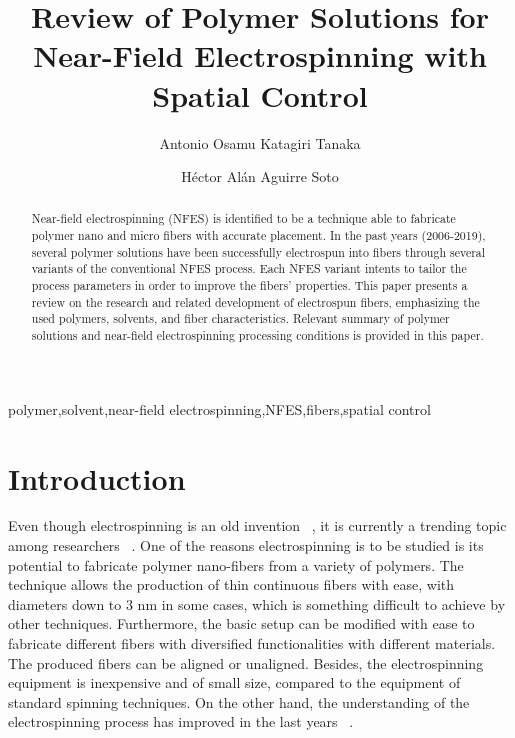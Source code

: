 \documentclass[3p,,preprint,12pt]{elsarticle}
\begin{document}
\begin{frontmatter}
	
\title{Review of Polymer Solutions for Near-Field Electrospinning with Spatial Control
}
    
\author[]{Antonio Osamu Katagiri Tanaka}
\author[]{H{\'e}ctor Al\'{a}n Aguirre Soto}
    

\begin{abstract}
Near-field electrospinning (NFES) is identified to be a technique able to fabricate polymer nano and micro fibers with accurate placement. In the past years (2006-2019), several polymer solutions have been successfully electrospun into fibers through several variants of the conventional NFES process. Each NFES variant intents to tailor the process parameters in order to improve the fibers' properties. This paper presents a review on the research and related development of electrospun fibers, emphasizing the used polymers, solvents, and fiber characteristics. Relevant summary of polymer solutions and near-field electrospinning processing conditions is provided in this paper.
\end{abstract}
\begin{keyword} 
      polymer\sep solvent\sep near-field electrospinning\sep NFES\sep fibers\sep spatial control
\end{keyword}
      
\end{frontmatter}
    
\section{Introduction}
Even though electrospinning is an old invention \unskip~\cite{527120:12073288}, it is currently a trending topic among researchers \unskip~\cite{527120:12073453,527120:12073495,527120:12073496}. One of the reasons electrospinning is to be studied is its potential to fabricate polymer nano-fibers from a variety of polymers. The technique allows the production of thin continuous fibers with ease, with diameters down to 3 nm in some cases, which is something difficult to achieve by other techniques. Furthermore, the basic setup can be modified with ease to fabricate different fibers with diversified functionalities with different materials. The produced fibers can be aligned or unaligned. Besides, the electrospinning equipment is inexpensive and of small size, compared to the equipment of standard spinning techniques. On the other hand, the understanding of the electrospinning process has improved in the last years \unskip~\cite{527120:12073538}.
\end{document}
